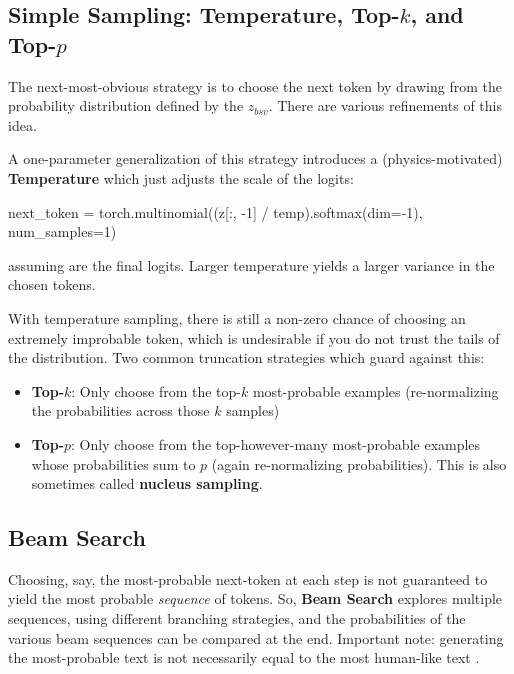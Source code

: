 \documentclass[11pt]{article}
\begin{document}
\subsection{Simple Sampling: Temperature, Top-$ k $, and Top-$ p $ \label{subsec_simple_sampling}}

The next-most-obvious strategy is to choose the next token by drawing from the probability
distribution defined by the $ z _{ bsv } $. There are various refinements of this idea.

A one-parameter generalization of this strategy
introduces a (physics-motivated) \textbf{Temperature} which just adjusts the scale of the logits:
\begin{py}
	next_token = torch.multinomial((z[:, -1] / temp).softmax(dim=-1), num_samples=1)
\end{py}
assuming  are the final logits. Larger temperature yields a larger variance in the chosen
tokens.

With temperature sampling, there is still a non-zero chance of choosing an extremely improbable token,
which is undesirable if you do not trust the tails of the distribution. Two common truncation
strategies which guard against this:
\begin{itemize}
	\item \textbf{Top-}$ k $: Only choose from the top-$ k $ most-probable examples (re-normalizing
	      the probabilities across those $ k $ samples)
	\item \textbf{Top-}$  p$: Only choose from the top-however-many most-probable examples whose
	      probabilities sum to $ p $ (again re-normalizing probabilities). This is also sometimes called
	      \textbf{nucleus sampling}.
\end{itemize}


\subsection{Beam Search \label{subsec_beam_search}}

Choosing, say, the most-probable next-token at each step is not guaranteed to yield the most
probable \textit{sequence} of tokens. So, \textbf{Beam Search} explores multiple sequences, using
different branching strategies, and the probabilities of the various beam sequences can be compared
at the end. Important note: generating the most-probable text is not necessarily equal to the most
human-like text \cite{holtzman2020curious}.
\end{document}
